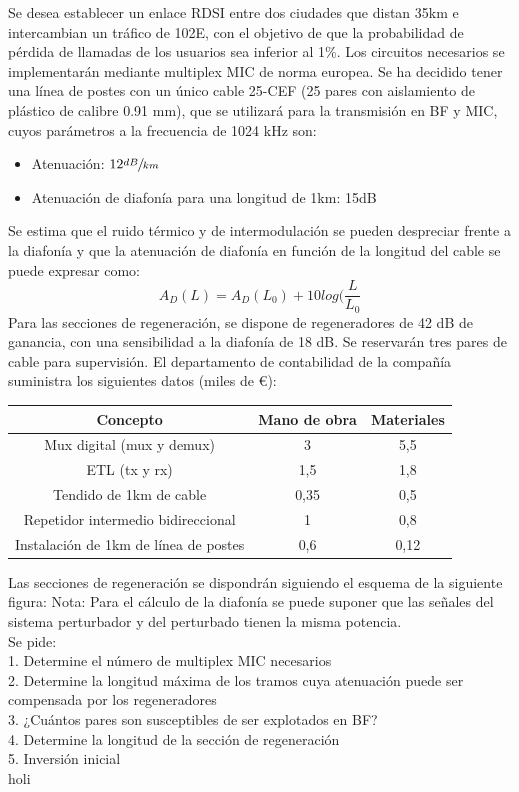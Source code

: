 \begin{exercise}[7]
	Se desea establecer un enlace RDSI entre dos ciudades que distan 35km e intercambian un tráfico de 102E, con el objetivo de que la probabilidad de pérdida de llamadas de los usuarios sea inferior al 1\%. Los circuitos necesarios se implementarán mediante multiplex MIC de norma europea. Se ha decidido tener una línea de postes con un único cable 25-CEF (25 pares con aislamiento de plástico de calibre 0.91 mm), que se utilizará para la transmisión en BF y MIC, cuyos parámetros a la frecuencia de 1024 kHz son:
\begin{itemize}
	\item Atenuación: $12\sfrac{dB}{km}$
	\item Atenuación de diafonía para una longitud de 1km: 15dB
\end{itemize}
Se estima que el ruido térmico y de intermodulación se pueden despreciar frente a la diafonía y que la atenuación de diafonía en función de la longitud del cable se puede expresar como:
\[A_D(L)=A_D(L_0)+10log(\frac{L}{L_0}\]
Para las secciones de regeneración, se dispone de regeneradores de 42 dB de ganancia, con una sensibilidad a la diafonía de 18 dB. Se reservarán tres pares de cable para supervisión. El departamento de contabilidad de la compañía suministra los siguientes datos (miles de €):
\begin{center}
\begin{tabular}{c c c}
	\hline
	\textbf{Concepto} & \textbf{Mano de obra} & \textbf{Materiales}\\\hline
	Mux digital (mux y demux) & 3 & 5,5\\
	ETL (tx y rx) & 1,5 & 1,8\\
	Tendido de 1km de cable & 0,35 & 0,5\\
	Repetidor intermedio bidireccional & 1 & 0,8\\
	Instalación de 1km de línea de postes & 0,6 & 0,12\\\hline
\end{tabular}
\end{center}
Las secciones de regeneración se dispondrán siguiendo el esquema de la siguiente figura:
Nota: Para el cálculo de la diafonía se puede suponer que las señales del sistema perturbador y del perturbado tienen la misma potencia.\\
Se pide:\\
1. Determine el número de multiplex MIC necesarios\\
2. Determine la longitud máxima de los tramos cuya atenuación puede ser compensada por los regeneradores\\
3. ¿Cuántos pares son susceptibles de ser explotados en BF?\\
4. Determine la longitud de la sección de regeneración\\
5. Inversión inicial\\
holi
\end{exercise}
